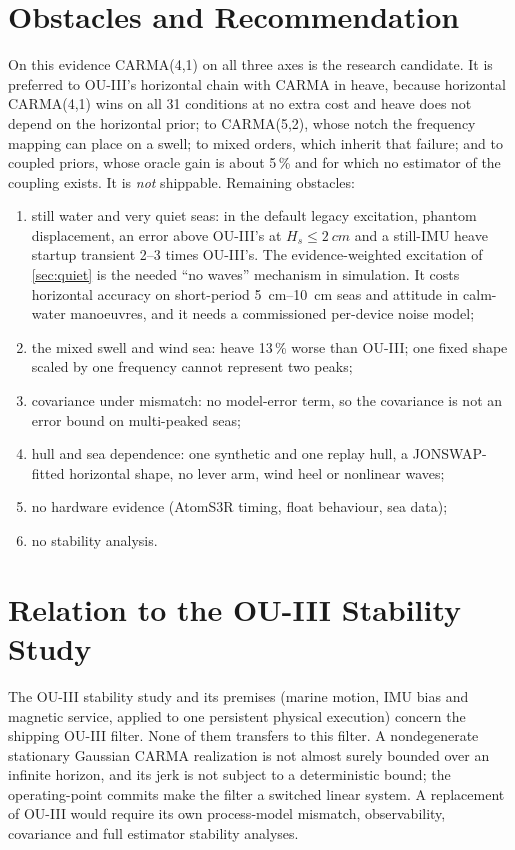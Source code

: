 \documentclass[conference]{IEEEtran}
\theoremstyle{bodysmall}
\begin{document}
\section{Obstacles and Recommendation}
\label{sec:obstacles}
On this evidence CARMA(4,1) on all three axes is the research candidate. It
is preferred to OU-III's horizontal chain with CARMA in heave, because
horizontal CARMA(4,1) wins on all 31 conditions at no extra cost and heave
does not depend on the horizontal prior; to CARMA(5,2), whose notch the
frequency mapping can place on a swell; to mixed orders, which inherit that
failure; and to coupled priors, whose oracle gain is about 5\,\% and for which
no estimator of the coupling exists. It is \emph{not} shippable. Remaining
obstacles:
\begin{enumerate}[leftmargin=*,itemsep=1pt]
\item still water and very quiet seas: in the default legacy excitation,
  phantom displacement, an error above OU-III's at $H_s\le\SI{2}{cm}$ and a
  still-IMU heave startup transient 2--3 times OU-III's. The
  evidence-weighted excitation of \cref{sec:quiet} is the needed ``no
  waves'' mechanism in simulation. It costs horizontal accuracy on
  short-period \SIrange{5}{10}{cm} seas and attitude in calm-water
  manoeuvres, and it needs a commissioned per-device noise model;
\item the mixed swell and wind sea: heave 13\,\% worse than OU-III; one fixed
  shape scaled by one frequency cannot represent two peaks;
\item covariance under mismatch: no model-error term, so the covariance is
  not an error bound on multi-peaked seas;
\item hull and sea dependence: one synthetic and one replay hull, a
  JONSWAP-fitted horizontal shape, no lever arm, wind heel or nonlinear
  waves;
\item no hardware evidence (AtomS3R timing, float behaviour, sea data);
\item no stability analysis.
\end{enumerate}

\section{Relation to the OU-III Stability Study}
The OU-III stability study and its premises (marine motion, IMU bias and
magnetic service, applied to one persistent physical execution) concern the
shipping OU-III filter. None of them transfers to this filter. A
nondegenerate stationary Gaussian CARMA realization is not almost surely
bounded over an infinite horizon, and its jerk is not subject to a
deterministic bound; the operating-point commits make the filter a switched
linear system. A replacement of OU-III would require its own process-model
mismatch, observability, covariance and full estimator stability analyses.
\end{document}
